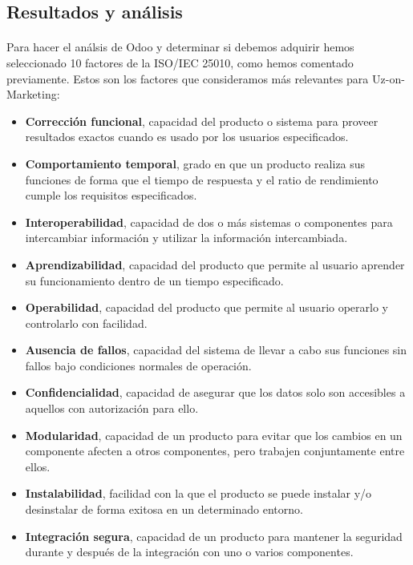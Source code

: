 \subsection{Resultados y análisis}
\paragraph{}
Para hacer el análsis de Odoo y determinar si debemos adquirir hemos seleccionado 10 factores de la ISO/IEC 25010, como hemos comentado previamente.
Estos son los factores que consideramos más relevantes para Uz-on-Marketing:
\begin{itemize}
    \item \textbf{Corrección funcional}, capacidad del producto o sistema para proveer resultados exactos cuando es usado por los usuarios especificados.
    \item \textbf{Comportamiento temporal}, grado en que un producto realiza sus funciones de forma que el tiempo de respuesta y el ratio de rendimiento cumple los requisitos especificados.
    \item \textbf{Interoperabilidad}, capacidad de dos o más sistemas o componentes para intercambiar información y utilizar la información intercambiada.
    \item \textbf{Aprendizabilidad}, capacidad del producto que permite al usuario aprender su funcionamiento dentro de un tiempo especificado.
    \item \textbf{Operabilidad}, capacidad del producto que permite al usuario operarlo y controlarlo con facilidad.
    \item \textbf{Ausencia de fallos}, capacidad del sistema de llevar a cabo sus funciones sin fallos bajo condiciones normales de operación.
    \item \textbf{Confidencialidad}, capacidad de asegurar que los datos solo son accesibles a aquellos con autorización para ello.
    \item \textbf{Modularidad}, capacidad de un producto para evitar que los cambios en un componente afecten a otros componentes, pero trabajen conjuntamente entre ellos.
    \item \textbf{Instalabilidad}, facilidad con la que el producto se puede instalar y/o desinstalar de forma exitosa en un determinado entorno.
    \item \textbf{Integración segura}, capacidad de un producto para mantener la seguridad durante y después de la integración con uno o varios componentes.
\end{itemize}
